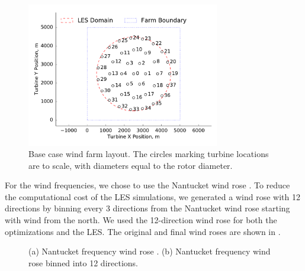 \documentclass[conf]{new-aiaa}
\begin{document}
\begin{figure}[ht]
	\centering
	\includegraphics[width=0.75\textwidth]{final_images/round_farm_38Turbines_5DSpacing_start.pdf}
	\caption{Base case wind farm layout. The circles marking turbine locations are to scale, with diameters equal to the rotor diameter.}
	\label{fig:starting-layout}
\end{figure}

For the wind frequencies, we chose to use the Nantucket wind rose \cite{wrcc2017}. %
To reduce the computational cost of the LES simulations, we generated a wind rose with 12 directions by binning every 3 directions from the Nantucket wind rose starting with wind from the north. We used the 12-direction wind rose for both the optimizations and the LES. The original and final wind roses are shown in .

\begin{figure}[ht]
	\centering
	\caption{(a) Nantucket frequency wind rose \cite{wrcc2017}. (b) Nantucket frequency wind rose binned into 12 directions.}
	\label{fig:windrose}
\end{figure}
\end{document}
